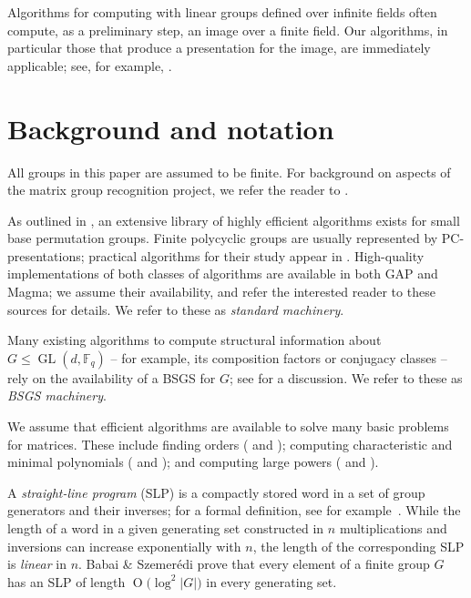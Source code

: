 \documentclass[12pt,twoside,reqno,psamsfonts]{amsproc}
\numberwithin{equation}{section}
\numberwithin{figure}{section}
\newcounter{algorithm}
\theoremstyle{plain}
\theoremstyle{definition}
\theoremstyle{remark}
\newcommand{\field}[1]{\mathbb{#1}}
\newcommand{\F}{\field{F}}
\newcommand{\GAP}{\textsf{GAP}}
\DeclareMathOperator{\GL}{GL}
\newcommand{\OR}[1]{\operatorname{O} \bigl( #1 \bigr)}
\begin{document}

Algorithms for computing with 
linear groups defined over infinite fields often compute,
as a preliminary step, an image over a finite field.
Our algorithms, in particular those that produce a presentation for the image,
are immediately applicable; see, for example, \cite{Tits,RecogInfinite}.

\section{Background and notation}
All groups in this paper are assumed to be finite.
For background on aspects of the matrix group recognition
project,  we refer the reader
to \cite{crlg01, MR2258009, OBrien11}. 

As outlined in \cite[Chapter 6]{seress03},
an extensive library of highly efficient algorithms exists 
for small base permutation groups. 
Finite polycyclic groups are usually represented 
by PC-presentations; practical algorithms for their study 
appear in \cite[Chapter 8]{hcgt}.
High-quality implementations of both classes of algorithms
are available in both {\sf GAP} and 
{\sc Magma}; we assume their availability,
and refer the interested reader to these sources for details. 
We refer to these as {\it standard machinery}.

Many existing algorithms to compute structural information
about $G\leqslant \GL(d, \F_q)$ -- for example, its composition factors
or conjugacy classes -- rely on the availability of a BSGS for $G$; 
see \cite{hcgt} for a discussion.
We refer to these as {\it BSGS machinery}.

We assume that efficient algorithms are available to  
solve many basic problems for matrices.
These include finding orders (\cite{crlg95} and 
\cite{MR2258009});
computing characteristic and minimal polynomials (\cite{NP08}
and \cite[\S 7.3]{hcgt});
and computing large powers (\cite[\S 3.1.1]{hcgt} and \cite{cr-odd}).

A {\it straight-line program} (SLP) 
is a compactly stored word in 
a set of group generators and their inverses; 
for a formal definition, see for example~\cite[\S 3.1.3]{hcgt}.
While the length of a word in a given generating set constructed in $n$
multiplications and inversions can increase exponentially with $n$,
the length of the corresponding SLP is {\it linear}
in $n$.  Babai \& Szemer{\'e}di \cite{BabaiSzemeredi84}
prove that every element of a finite
group $G$ has an SLP of length $\OR{\log^2|G|}$
in every generating set.
\end{document}
